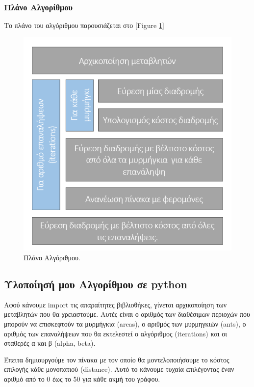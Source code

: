 \subsubsection{Πλάνο Αλγορίθμου}
Το πλάνο του αλγόριθμου παρουσιάζεται στο [Figure \ref{plan}]
\begin{figure}
    \centering
    \includegraphics[scale=0.80]{2947_thesis/pictures/plan.png} 
    \caption{Πλάνο Αλγόριθμου.}
    \label{plan}
\end{figure}

\subsection{Υλοποίησή μου Αλγορίθμου σε python}
Αφού κάνουμε import τις απαραίτητες βιβλιοθήκες, γίνεται αρχικοποίηση των μεταβλητών που θα χρειαστούμε. Αυτές είναι ο αριθμός των διαθέσιμων περιοχών που μπορούν να επισκεφτούν τα μυρμήγκια (areas), ο αριθμός των μυρμηγκιών (ants), ο αριθμός των επαναλήψεων που θα εκτελεστεί ο αλγόριθμος (iterations) και οι σταθερές α και β (alpha, beta).


Έπειτα δημιουργούμε τον πίνακα με τον οποίο θα μοντελοποιήσουμε το κόστος επιλογής κάθε μονοπατιού (distance). Αυτό το κάνουμε τυχαία επιλέγοντας έναν αριθμό από το 0 έως το 50 για κάθε ακμή του γράφου.


